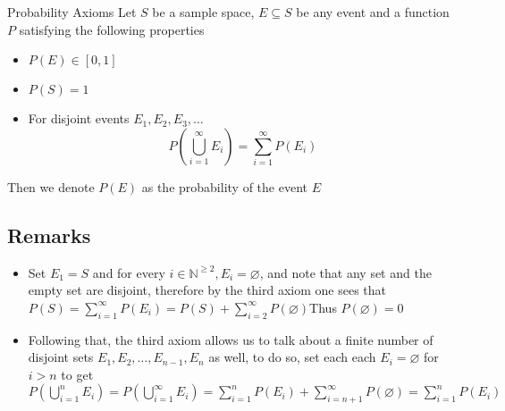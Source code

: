 \documentclass{standalone}
\begin{document}
\begin{defn*}{Probability Axioms}
Let \(S\) be a sample space, \(E \subseteq S\) be any event and a
function \(P\) satisfying the following properties

\begin{itemize}
\item
  \(P(E) \in [0,1]\)
\item
  \(P(S) = 1\)
\item
  For disjoint events \(E_1, E_2, E_3, \dots\) 
  \[
  P\left( \bigcup_{i=1}^{\infty} E_{i}\right) = \sum_{i=1}^{\infty} P\left(E_{i}\right)
\]
\end{itemize}

Then we denote \(P(E)\) as the probability of the event \(E\)

\subsection*{Remarks}

\begin{itemize}
\item
  Set \(E_{1}= S\) and for every
  \(i \in \mathbb{N} ^{ \ge 2}, E_{i} = \varnothing\), and note that any
  set and the empty set are disjoint, therefore by the third axiom one
  sees that
  \(P\left(S\right)= \sum_{i=1}^{\infty} P\left(E_{i}\right) = P\left(S\right)  +  \sum_{i=2}^{\infty} P\left( \varnothing\right)\)Thus
  \(P\left( \varnothing\right) = 0\)
\item
  Following that, the third axiom allows us to talk about a finite
  number of disjoint sets
  \(E_{1} , E_{2} , \dotsc  , E_{n - 1} , E_{n}\) as well, to do so, set
  each each \(E_{i} = \varnothing\) for \(i > n\) to get
  \(P\left( \bigcup_{i=1}^{n} E_{i}\right) = P\left( \bigcup_{i=1}^{\infty} E_{i}\right)= \sum_{i=1}^{n} P\left(E_{i}\right)  +  \sum_{i=n  +  1}^{\infty} P\left( \varnothing\right) = \sum_{i=1}^{n} P\left(E_{i}\right)\)
\end{itemize}

\end{defn*}
\end{document}
